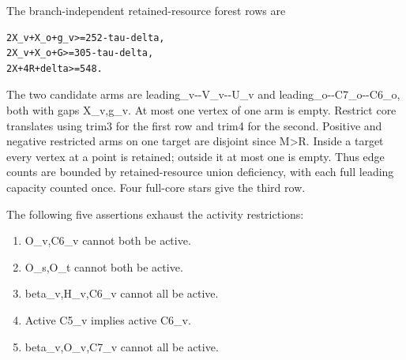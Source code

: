 \documentclass[10pt,a4paper]{article}
\theoremstyle{definition}
\providecommand{\tightlist}{\setlength{\itemsep}{0pt}\setlength{\parskip}{0pt}}
\begin{document}
The branch-independent retained-resource forest rows are

\begin{lstlisting}
2X_v+X_o+g_v>=252-tau-delta,
2X_v+X_o+G>=305-tau-delta,
2X+4R+delta>=548.
\end{lstlisting}

The two candidate arms are leading\_\allowbreak{}v-\/-V\_\allowbreak{}v-\/-U\_\allowbreak{}v and
leading\_\allowbreak{}o-\/-C7\_\allowbreak{}o-\/-C6\_\allowbreak{}o,\allowbreak{} both with gaps X\_\allowbreak{}v,\allowbreak{}g\_\allowbreak{}v. At most one
vertex of one arm is empty. Restrict core translates using trim3 for the
first row and trim4 for the second. Positive and negative restricted
arms on one target are disjoint since M\textgreater R. Inside a target
every vertex at a point is retained; outside it at most one is empty.
Thus edge counts are bounded by retained-resource union deficiency,\allowbreak{} with
each full leading capacity counted once. Four full-core stars give the
third row.

The following five assertions exhaust the activity restrictions:

\begin{enumerate}
\def\labelenumi{\arabic{enumi}.}
\tightlist
\item
  O\_\allowbreak{}v,\allowbreak{}C6\_\allowbreak{}v cannot both be active.
\item
  O\_\allowbreak{}s,\allowbreak{}O\_\allowbreak{}t cannot both be active.
\item
  beta\_\allowbreak{}v,\allowbreak{}H\_\allowbreak{}v,\allowbreak{}C6\_\allowbreak{}v cannot all be active.
\item
  Active C5\_\allowbreak{}v implies active C6\_\allowbreak{}v.
\item
  beta\_\allowbreak{}v,\allowbreak{}O\_\allowbreak{}v,\allowbreak{}C7\_\allowbreak{}v cannot all be active.
\end{enumerate}
\end{document}
